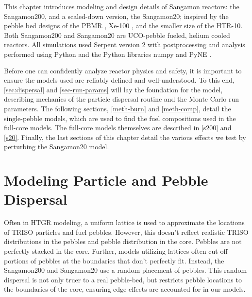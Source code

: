 This chapter introduces modeling and design details of Sangamon reactors:  the Sangamon200, and a scaled-down version, the Sangamon20; inspired by the pebble bed designs of the PBMR \cite{venter_pbmr_2005, noauthor_pebble_2017}, Xe-100 \cite{harlan_ans_2017, harlan_x-energy_2018}, and the smaller size of the HTR-10.  Both Sangamon200 and Sangamon20 are UCO-pebble fueled, helium cooled reactors.  All simulations used Serpent version 2 \cite{leppanenjaakko_serpent_2015} with postprocessing and analysis performed using Python \cite{van_rossum_python_nodate} and the Python libraries numpy \cite{harris_array_2020} and PyNE \cite{scopatz_pyne:_2012}.

Before one can confidently analyze reactor physics and safety, it is important to ensure the models used are reliably defined and well-understood.  To this end, \autoref{sec:dispersal} and \autoref{sec-run-params} will lay the foundation for the model, describing mechanics of the particle dispersal routine and the Monte Carlo run parameters.  The following sections, \autoref{meth-burn} and \autoref{meth-comp}, detail the single-pebble models, which are used to find the fuel compositions used in the full-core models.  The full-core models themselves are described in \autoref{s200} and \autoref{s20}.  Finally, the last sections of this chapter detail the various effects we test by perturbing the Sangamon20 model.

\section{Modeling Particle and Pebble Dispersal}
\label{sec:dispersal}

Often in HTGR modeling, a uniform lattice is used to approximate the locations of TRISO particles and fuel pebbles.  However, this doesn't reflect realistic TRISO distributions in the pebbles and pebble distribution in the core.  Pebbles are not perfectly stacked in the core.  Further, models utilizing lattices often cut off portions of pebbles at the boundaries that don't perfectly fit.  Instead, the Sangamon200 and Sangamon20 use a random placement of pebbles.  This random dispersal is not only truer to a real pebble-bed, but restricts pebble locations to the boundaries of the core, ensuring edge effects are accounted for in our models.

